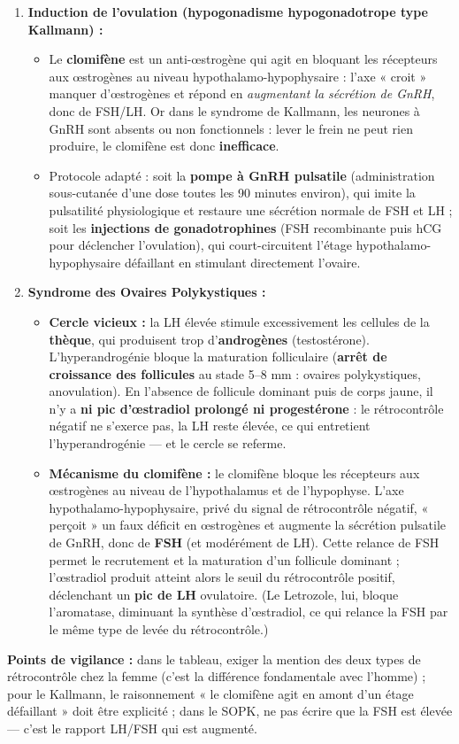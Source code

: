 \documentclass[11pt]{article}
\begin{document}
\begin{corrige}
\begin{enumerate}
    \item \textbf{Induction de l'ovulation (hypogonadisme hypogonadotrope type Kallmann) :}
    \begin{itemize}
        \item[a.] Le \textbf{clomifène} est un anti-œstrogène qui agit en bloquant les récepteurs aux œstrogènes au niveau hypothalamo-hypophysaire : l'axe « croit » manquer d'œstrogènes et répond en \emph{augmentant la sécrétion de GnRH}, donc de FSH/LH. Or dans le syndrome de Kallmann, les neurones à GnRH sont absents ou non fonctionnels : lever le frein ne peut rien produire, le clomifène est donc \textbf{inefficace}.
        \item[b.] Protocole adapté : soit la \textbf{pompe à GnRH pulsatile} (administration sous-cutanée d'une dose toutes les 90 minutes environ), qui imite la pulsatilité physiologique et restaure une sécrétion normale de FSH et LH ; soit les \textbf{injections de gonadotrophines} (FSH recombinante puis hCG pour déclencher l'ovulation), qui court-circuitent l'étage hypothalamo-hypophysaire défaillant en stimulant directement l'ovaire.
    \end{itemize}
    \item \textbf{Syndrome des Ovaires Polykystiques :}
    \begin{itemize}
        \item[a.] \textbf{Cercle vicieux :} la LH élevée stimule excessivement les cellules de la \textbf{thèque}, qui produisent trop d'\textbf{androgènes} (testostérone). L'hyperandrogénie bloque la maturation folliculaire (\textbf{arrêt de croissance des follicules} au stade 5--8 mm : ovaires polykystiques, anovulation). En l'absence de follicule dominant puis de corps jaune, il n'y a \textbf{ni pic d'œstradiol prolongé ni progestérone} : le rétrocontrôle négatif ne s'exerce pas, la LH reste élevée, ce qui entretient l'hyperandrogénie — et le cercle se referme.
        \item[b.] \textbf{Mécanisme du clomifène :} le clomifène bloque les récepteurs aux œstrogènes au niveau de l'hypothalamus et de l'hypophyse. L'axe hypothalamo-hypophysaire, privé du signal de rétrocontrôle négatif, « perçoit » un faux déficit en œstrogènes et augmente la sécrétion pulsatile de GnRH, donc de \textbf{FSH} (et modérément de LH). Cette relance de FSH permet le recrutement et la maturation d'un follicule dominant ; l'œstradiol produit atteint alors le seuil du rétrocontrôle positif, déclenchant un \textbf{pic de LH} ovulatoire. (Le Letrozole, lui, bloque l'aromatase, diminuant la synthèse d'œstradiol, ce qui relance la FSH par le même type de levée du rétrocontrôle.)
    \end{itemize}
\end{enumerate}
\textbf{Points de vigilance :} dans le tableau, exiger la mention des deux types de rétrocontrôle chez la femme (c'est la différence fondamentale avec l'homme) ; pour le Kallmann, le raisonnement « le clomifène agit en amont d'un étage défaillant » doit être explicité ; dans le SOPK, ne pas écrire que la FSH est élevée — c'est le rapport LH/FSH qui est augmenté.
\end{corrige}
\end{document}
